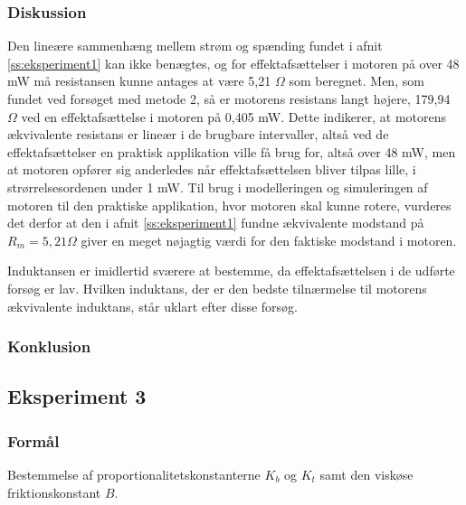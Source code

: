 \subsubsection{Diskussion}
Den lineære sammenhæng mellem strøm og spænding fundet i afnit \ref{ss:eksperiment1} kan ikke benægtes,
og for effektafsættelser i motoren på over 48 mW må resistansen kunne antages at være 5,21 $\Omega$ som beregnet.
Men, som fundet ved forsøget med metode 2, så er motorens resistans langt højere,
179,94 $\Omega$ ved en effektafsættelse i motoren på 0,405 mW.
Dette indikerer, at motorens ækvivalente resistans er lineær i de brugbare intervaller, altså ved de effektafsættelser en
praktisk applikation ville få brug for, altså over 48 mW, men at motoren opfører sig anderledes når effektafsættelsen
bliver tilpas lille, i strørrelsesordenen under 1 mW.
Til brug i modelleringen og simuleringen af motoren til den praktiske applikation, hvor motoren skal kunne rotere,
vurderes det derfor at den i afnit \ref{ss:eksperiment1} fundne ækvivalente modstand på $R_m=5,21 \Omega$ giver en meget
nøjagtig værdi for den faktiske modstand i motoren.

Induktansen er imidlertid sværere at bestemme, da effektafsættelsen i de udførte forsøg er lav.
Hvilken induktans, der er den bedste tilnærmelse til motorens ækvivalente induktans,
står uklart efter disse forsøg.

\subsubsection{Konklusion}


\subsection{Eksperiment 3}
\subsubsection{Formål}
Bestemmelse af proportionalitetskonstanterne $K_b$ og $K_t$ samt den viskøse friktionskonstant $B$.
